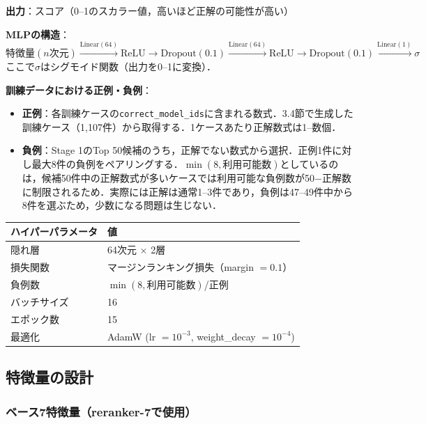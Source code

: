 \documentclass[11pt,a4paper]{ltjsarticle}
\begin{document}
\textbf{出力}：スコア（0--1のスカラー値，高いほど正解の可能性が高い）

\textbf{MLPの構造}：
\[
  \text{特徴量}(n\text{次元}) \xrightarrow{\text{Linear}(64)} \text{ReLU} \to \text{Dropout}(0.1) \xrightarrow{\text{Linear}(64)} \text{ReLU} \to \text{Dropout}(0.1) \xrightarrow{\text{Linear}(1)} \sigma
\]
ここで$\sigma$はシグモイド関数（出力を0--1に変換）．

\textbf{訓練データにおける正例・負例}：
\begin{itemize}[nosep]
  \item \textbf{正例}：各訓練ケースの\texttt{correct\_model\_ids}に含まれる数式．3.4節で生成した訓練ケース（1,107件）から取得する．1ケースあたり正解数式は1--数個．
  \item \textbf{負例}：Stage 1のTop 50候補のうち，正解でない数式から選択．正例1件に対し最大8件の負例をペアリングする．$\min(8, \text{利用可能数})$としているのは，候補50件中の正解数式が多いケースでは利用可能な負例数が50$-$正解数に制限されるため．実際には正解は通常1--3件であり，負例は47--49件中から8件を選ぶため，少数になる問題は生じない．
\end{itemize}

\begin{table}[h]
\centering
\begin{tabular}{ll}
\toprule
ハイパーパラメータ & 値 \\
\midrule
隠れ層 & 64次元 $\times$ 2層 \\
損失関数 & マージンランキング損失（margin $= 0.1$） \\
負例数 & $\min(8, \text{利用可能数})$/正例 \\
バッチサイズ & 16 \\
エポック数 & 15 \\
最適化 & AdamW (lr $= 10^{-3}$, weight\_decay $= 10^{-4}$) \\
\bottomrule
\end{tabular}
\end{table}

\subsection{特徴量の設計}

\subsubsection{ベース7特徴量（reranker-7で使用）}
\end{document}
